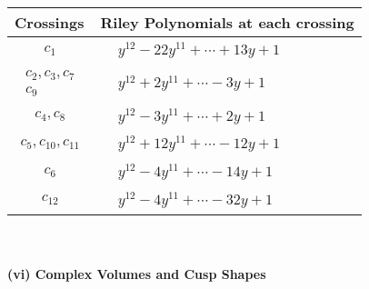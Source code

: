 \documentclass[1p]{elsarticle_modified}
\theoremstyle{definition}
\begin{document}
\begin{tabular}{m{50pt}|m{274pt}}
Crossings & \hspace{64pt}Riley Polynomials at each crossing \\
\hline $$\begin{aligned}c_{1}\end{aligned}$$&$\begin{aligned}
&y^{12}-22 y^{11}+\cdots+13 y+1
\end{aligned}$\\
\hline $$\begin{aligned}c_{2},c_{3},c_{7}\\c_{9}\end{aligned}$$&$\begin{aligned}
&y^{12}+2 y^{11}+\cdots-3 y+1
\end{aligned}$\\
\hline $$\begin{aligned}c_{4},c_{8}\end{aligned}$$&$\begin{aligned}
&y^{12}-3 y^{11}+\cdots+2 y+1
\end{aligned}$\\
\hline $$\begin{aligned}c_{5},c_{10},c_{11}\end{aligned}$$&$\begin{aligned}
&y^{12}+12 y^{11}+\cdots-12 y+1
\end{aligned}$\\
\hline $$\begin{aligned}c_{6}\end{aligned}$$&$\begin{aligned}
&y^{12}-4 y^{11}+\cdots-14 y+1
\end{aligned}$\\
\hline $$\begin{aligned}c_{12}\end{aligned}$$&$\begin{aligned}
&y^{12}-4 y^{11}+\cdots-32 y+1
\end{aligned}$\\
\hline
\end{tabular}\\~\\
\newpage\flushleft \textbf{(vi) Complex Volumes and Cusp Shapes}
\end{document}
